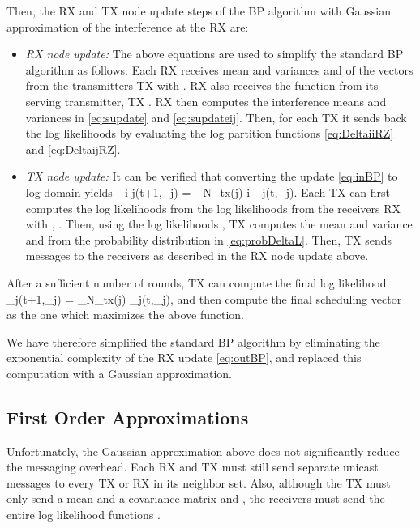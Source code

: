 \documentclass[letterpaper,twocolumn,twoside]{IEEEtran}
\def\beq{}
\def\la{\leftarrow}
\def\ra{\rightarrow}
\newcommand{\xbf}{\mathbf{x}}
\def\Ntx{N_{\rm tx}}
\begin{document}
Then, the RX and TX node update steps of the BP algorithm with
Gaussian approximation of the interference at the RX are:
\begin{itemize}
\item \emph{RX node update:}
The above equations are used to simplify the standard BP algorithm
as follows. Each RX  receives mean and variances  and  of the vectors from the
transmitters TX  with . RX  also receives the
function  from its serving transmitter,
TX . RX  then computes the interference means and variances in
\eqref{eq:supdate} and \eqref{eq:supdateij}. Then, for each TX 
it sends back the log likelihoods  by
evaluating the log partition functions \eqref{eq:DeltaiiRZ} and
\eqref{eq:DeltaijRZ}.

\item \emph{TX node update:}
It can be verified that converting the update \eqref{eq:inBP} to log
domain yields \beq \label{eq:DeltaijLSum}
    \Delta_{i \la j}(t+1,\xbf_j) = \sum_{\ell \in \Ntx(j) \neq i}
        \Delta_{\ell \ra j}(t,\xbf_j).
\eeq Each TX  can first computes the log likelihoods  from the log likelihoods  from the receivers RX  with ,
. Then, using the log likelihoods  , TX  computes the mean and variance  and  from the probability
distribution  in \eqref{eq:probDeltaL}.
Then, TX  sends messages to the receivers as described in the RX
node update above.
\end{itemize}
After a sufficient number of rounds, TX  can compute the final
log likelihood \beq \label{eq:DeltajLSum}
    \Delta_{j}(t+1,\xbf_j) = \sum_{\ell \in \Ntx(j)} \Delta_{\ell \ra j}(t,\xbf_j),
\eeq and then compute the final scheduling vector as the one which
maximizes the above function.

We have therefore simplified the standard BP algorithm by
eliminating the exponential complexity of the RX update
\eqref{eq:outBP}, and replaced this computation with a Gaussian
approximation.

\subsection{First Order Approximations} \label{sec:firstOrderApprox}
Unfortunately, the Gaussian approximation above does not
significantly reduce the messaging overhead.  Each RX and TX must
still send separate unicast messages to every TX or RX in its
neighbor set.  Also, although the TX must only send a mean and a
covariance matrix  and ,
the receivers must send the entire log likelihood functions
.
\end{document}
